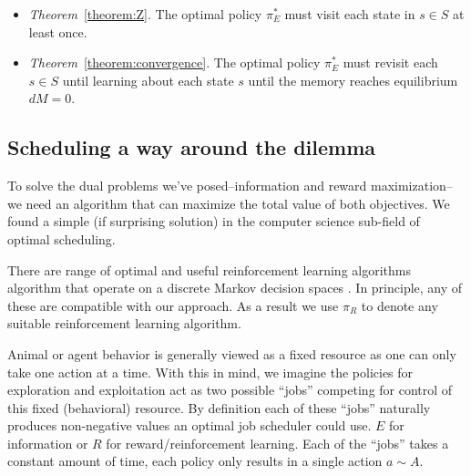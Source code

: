 \documentclass[10pt,letterpaper]{article}
\begin{document}
\begin{itemize}
    \item \textit{Theorem}~\ref{theorem:Z}. The optimal policy $\pi^*_E$ must visit each state in $s \in S$ at least once.
    \item \textit{Theorem}~\ref{theorem:convergence}. The optimal policy $\pi^*_E$ must revisit each $s \in S$ until learning about each state $s$ until the memory reaches equilibrium $dM = 0$.
\end{itemize}


\subsection{Scheduling a way around the dilemma}
To solve the dual problems we've posed--information and reward maximization--we need an algorithm that can maximize the total value of both objectives. We found a simple (if surprising solution) in the computer science sub-field of optimal scheduling. 

There are range of optimal and useful reinforcement learning algorithms algorithm that operate on a discrete Markov decision spaces
\cite{Sutton2018}. In principle, any of these are compatible with our approach. As a result we use $\pi_R$ to denote any suitable reinforcement learning algorithm.

Animal or agent behavior is generally viewed as a fixed resource as one can only take one action at a time. With this in mind, we imagine the policies for exploration and exploitation act as two possible ``jobs'' competing for control of this fixed (behavioral) resource. By definition each of these ``jobs'' naturally produces non-negative values an optimal job scheduler could use. $E$ for information or $R$ for reward/reinforcement learning. Each of the ``jobs'' takes a constant amount of time, each policy only results in a single action $a \sim A$.
\end{document}
